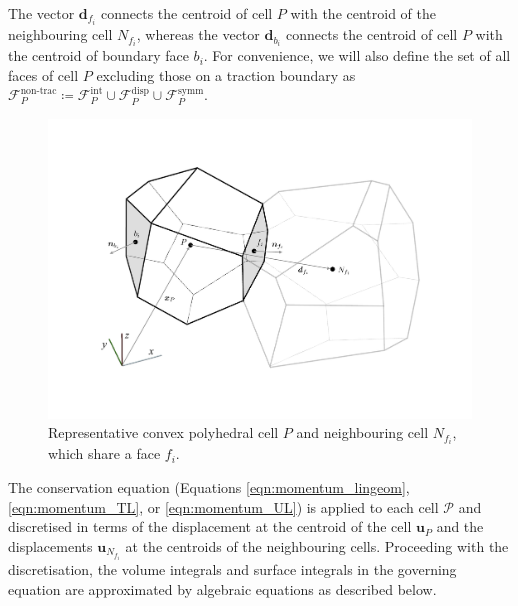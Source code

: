 \documentclass[sn-mathphys,Numbered]{sn-jnl}%
\newcommand{\bb}{\boldsymbol}
\begin{document}
The vector $\mathbf{d}_{f_i}$ connects the centroid of cell $P$ with the centroid of the neighbouring cell $N_{f_i}$, whereas the vector $\mathbf{d}_{b_i}$ connects the centroid of cell $P$ with the centroid of boundary face ${b_i}$.
For convenience, we will also define the set of all faces of cell $P$ excluding those on a traction boundary as $\mathcal{F}_P^{\text{non-trac}} \coloneqq \mathcal{F}_P^{\text{int}} \cup \mathcal{F}_P^{\text{disp}} \cup \mathcal{F}_P^{\text{symm}}$.
\begin{figure}[htbp]
	\centering
   		\includegraphics[width=\textwidth]{figures/cell} 
	\caption{Representative convex polyhedral cell $P$ and neighbouring cell $N_{f_i}$, which share a face $f_i$.}
	\label{fig:cell}
\end{figure}


The conservation equation (Equations \ref{eqn:momentum_lingeom}, \ref{eqn:momentum_TL}, or \ref{eqn:momentum_UL}) is applied to each cell $\mathcal{P}$ and discretised in terms of the displacement at the centroid of the cell $\boldsymbol{u}_P$ and the displacements $\boldsymbol{u}_{N_{f_i}}$ at the centroids of the neighbouring cells.
Proceeding with the discretisation, the volume integrals and surface integrals in the governing equation are approximated by algebraic equations as described below.
\end{document}
